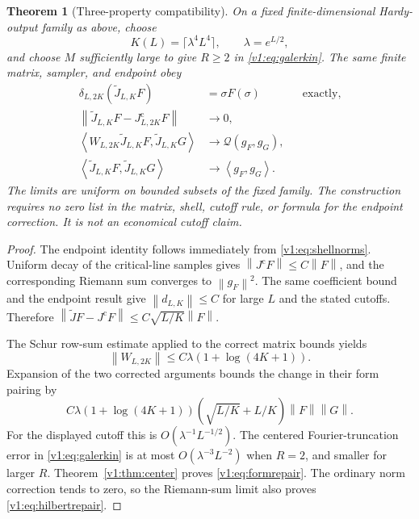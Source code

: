 \documentclass[11pt]{article}
\newtheorem{theorem}{Theorem}[section]
\theoremstyle{remark}
\newcommand{\norm}[1]{\left\lVert #1\right\rVert}
\newcommand{\ip}[2]{\left\langle #1,#2\right\rangle}
\newcommand{\Q}{\mathcal Q}
\newcommand{\Jc}{J^{\mathrm c}}
\newcommand{\Jr}{\widetilde J}
\begin{document}
\begin{theorem}[Three-property compatibility]\label{v1:thm:repair}
On a fixed finite-dimensional Hardy-output family as above, choose
\[
 K(L)=\lceil\lambda^4L^4\rceil,\qquad \lambda=e^{L/2},
\]
and choose $M$ sufficiently large to give $R\ge2$ in
\eqref{v1:eq:galerkin}. The same finite matrix, sampler, and endpoint obey
\begin{align}
 \delta_{L,2K}(\Jr_{L,K}F)&=\sigma F(\sigma)
                       &&\text{exactly},\label{v1:eq:exactendpoint}\\
 \norm{\Jr_{L,K}F-\Jc_{L,2K}F}&\longrightarrow0,\label{v1:eq:normrepair}\\
 \ip{W_{L,2K}\Jr_{L,K}F}{\Jr_{L,K}G}
            &\longrightarrow\Q(g_F,g_G),\label{v1:eq:formrepair}\\
 \ip{\Jr_{L,K}F}{\Jr_{L,K}G}
            &\longrightarrow\ip{g_F}{g_G}.\label{v1:eq:hilbertrepair}
\end{align}
The limits are uniform on bounded subsets of the fixed family. The
construction requires no zero list in the matrix, shell, cutoff rule, or
formula for the endpoint correction. It is not an economical cutoff claim.
\end{theorem}
\begin{proof}
The endpoint identity follows immediately from \eqref{v1:eq:shellnorms}.
Uniform decay of the critical-line samples gives
$\norm{\Jc F}\le C\norm F$, and the corresponding Riemann sum converges
to $\norm{g_F}^2$. The same coefficient bound and the endpoint result give
$\norm{d_{L,K}}\le C$ for large $L$ and the stated cutoffs. Therefore
$\norm{\Jr F-\Jc F}\le C\sqrt{L/K}\norm F$.

The Schur row-sum estimate applied to the correct matrix bounds yields
\begin{equation}\label{v1:eq:opnorm}
 \norm{W_{L,2K}}\le C\lambda(1+\log(4K+1)).
\end{equation}
Expansion of the two corrected arguments bounds the change in their
form pairing by
\begin{equation}\label{v1:eq:formprice}
 C\lambda(1+\log(4K+1))
       \left(\sqrt{L/K}+L/K\right)\norm F\norm G.
\end{equation}
For the displayed cutoff this is $O(\lambda^{-1}L^{-1/2})$.
The centered Fourier-truncation error in \eqref{v1:eq:galerkin} is at most
$O(\lambda^{-3}L^{-2})$ when $R=2$, and smaller for larger $R$.
Theorem~\ref{v1:thm:center} proves \eqref{v1:eq:formrepair}.
The ordinary norm correction tends to zero, so the Riemann-sum limit also
proves \eqref{v1:eq:hilbertrepair}.
\end{proof}
\end{document}
